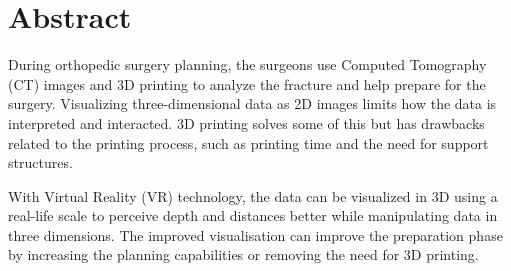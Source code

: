 \documentclass[a4paper]{report}
\begin{document}
%
%


\makeatletter
{}
\def\lst@SkipToFirst{%
    \lst@ifmatchrangestart\c@lstnumber=\numexpr-1+\lst@firstline\fi
    \ifnum \lst@lineno<\lst@firstline
        \def\lst@next{\lst@BeginDropInput\lst@Pmode
        \lst@Let{13}\lst@MSkipToFirst
        \lst@Let{10}\lst@MSkipToFirst}%
        \expandafter\lst@next
    \else
        \expandafter\lst@BOLGobble
    \fi}
\makeatother



\titlePage
\pagebreak

\section*{Abstract}
During orthopedic surgery planning, the surgeons use Computed Tomography (CT) images and 3D printing to analyze the fracture and help prepare for the surgery.
Visualizing three-dimensional data as 2D images limits how the data is interpreted and interacted. 3D printing solves some of this but has drawbacks related to the printing process, such as printing time and the need for support structures.

With Virtual Reality (VR) technology, the data can be visualized in 3D using a real-life scale to perceive depth and distances better while manipulating data in three dimensions. The improved visualisation can improve the preparation phase by increasing the planning capabilities or removing the need for 3D printing.
\end{document}
